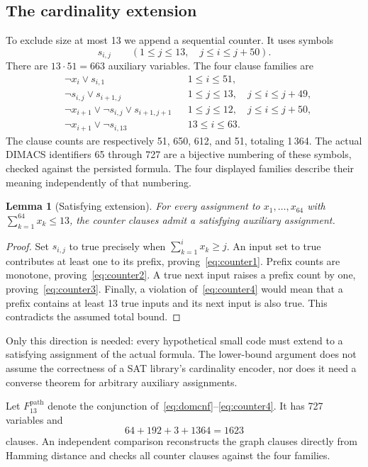 \documentclass[11pt]{article}
\newtheorem{lemma}[theorem]{Lemma}
\begin{document}
\subsection{The cardinality extension}
To exclude size at most 13 we append a sequential counter. It uses symbols
\[
 s_{i,j}\qquad (1\leq j\leq13,\quad j\leq i\leq j+50).
\]
There are $13\cdot51=663$ auxiliary variables. The four clause families are
\begin{align}
 &\neg x_i\vee s_{i,1}
 &&1\leq i\leq51,\label{eq:counter1}\\
 &\neg s_{i,j}\vee s_{i+1,j}
 &&1\leq j\leq13,\quad j\leq i\leq j+49,\label{eq:counter2}\\
 &\neg x_{i+1}\vee\neg s_{i,j}\vee s_{i+1,j+1}
 &&1\leq j\leq12,\quad j\leq i\leq j+50,\label{eq:counter3}\\
 &\neg x_{i+1}\vee\neg s_{i,13}
 &&13\leq i\leq63.\label{eq:counter4}
\end{align}
The clause counts are respectively 51, 650, 612, and 51, totaling 1\,364. The actual DIMACS identifiers 65 through 727 are a bijective numbering of these symbols, checked against the persisted formula. The four displayed families describe their meaning independently of that numbering.

\begin{lemma}[Satisfying extension]\label{lem:extension}
For every assignment to $x_1,\ldots,x_{64}$ with $\sum_{k=1}^{64}x_k\leq13$, the counter clauses admit a satisfying auxiliary assignment.
\end{lemma}
\begin{proof}
Set $s_{i,j}$ to true precisely when $\sum_{k=1}^i x_k\geq j$. An input set to true contributes at least one to its prefix, proving~\eqref{eq:counter1}. Prefix counts are monotone, proving~\eqref{eq:counter2}. A true next input raises a prefix count by one, proving~\eqref{eq:counter3}. Finally, a violation of~\eqref{eq:counter4} would mean that a prefix contains at least 13 true inputs and its next input is also true. This contradicts the assumed total bound.
\end{proof}
Only this direction is needed: every hypothetical small code must extend to a satisfying assignment of the actual formula. The lower-bound argument does not assume the correctness of a SAT library's cardinality encoder, nor does it need a converse theorem for arbitrary auxiliary assignments.

Let $F_{13}^{\mathrm{path}}$ denote the conjunction of~\eqref{eq:domcnf}--\eqref{eq:counter4}. It has 727 variables and
\[
 64+192+3+1364=1623
\]
clauses. An independent comparison reconstructs the graph clauses directly from Hamming distance and checks all counter clauses against the four families.
\end{document}
